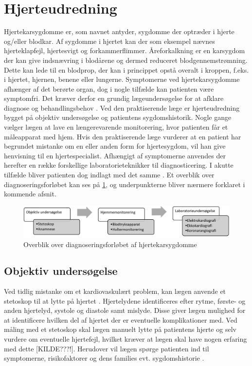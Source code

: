 \section{Hjerteudredning}
Hjertekarsygdomme er, som navnet antyder, sygdomme der optræder i hjerte og/eller blodkar. Af sygdomme i hjertet kan der som eksempel nævnes hjerteklapfejl, hjertesvigt og forkammerflimmer. Åreforkalkning er en karsygdom der kan give indsnævring i blodårene og dermed reduceret blodgennemstrømning. Dette kan lede til en blodprop, der kan i princippet opstå overalt i kroppen, f.eks. i hjertet, hjernen, benene eller lungerne. Symptomerne ved hjertekarsygdomme afhænger af det berørte organ, dog i nogle tilfælde kan patienten være symptomfri. Det kræver derfor en grundig lægeundersøgelse for at afklare diagnose og behandlingsbehov \cite{apoteket}. Ved den praktiserende læge er hjerteudredning bygget på objektiv undersøgelse og patientens sygdomshistorik. Nogle gange vælger lægen at lave en længerevarende monitorering, hvor patienten får et måleapparat med hjem. Hvis den praktiserende læge vurderer at en patient har begrundet mistanke om en eller anden form for hjertesygdom, vil han give henvisning til en hjertespecialist. Afhængigt af symptomerne anvendes der herefter en række forskellige laboratorieteknikker til diagnosticering. I akutte tilfælde bliver patienten dog indlagt med det samme \cite{hjerud}. Et overblik over diagnoseringsforløbet kan ses på \ref{fig:forloeb}, og underpunkterne bliver nærmere forklaret i kommende afsnit.

\begin{figure}[H] %
\begin{center}
\includegraphics[width=1\textwidth]{figures/forloeb}
\end{center}
\caption{Overblik over diagnoseringsforløbet af hjertekarsygdomme}
\label{fig:forloeb}
\end{figure}

\subsection{Objektiv undersøgelse}
Ved tidlig mistanke om et kardiovaskulært problem, kan lægen anvende et stetoskop til at lytte på hjertet \cite{subob}. Hjertelydene identificeres efter rytme, første- og anden hjertelyd, systole og diastole samt mislyde. Disse giver lægen mulighed for at identificere hvilken del af hjertet der er eventuelle komplikationer med. Ved måling med et stetoskop skal lægen manuelt lytte på patientens hjerte og selv vurdere om eventuelle hjertefejl, hvilket kræver at lægen skal have nogen erfaring med dette [KILDE???!]. Herudover vil lægen spørge patienten ind til symptomerne, risikofaktorer og dens families evt. sygdomshistorie \cite{hjerud}. 
 
